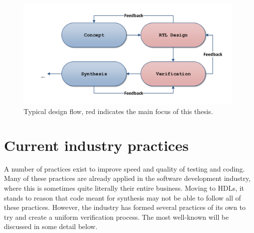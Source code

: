 \documentclass[11pt,british]{article}
\begin{document}
\begin{figure}[h]
    \centering
	\includegraphics[width=.8\textwidth]{images/designflow2.pdf}
    \caption{Typical design flow, red indicates the main focus of this thesis.}
    \label{fig:Design_Flow}
\end{figure}


\newpage

\section{Current industry practices}
\label{sec:industry}
A number of practices exist to improve speed and quality of testing and coding. Many of these practices are already applied in the software development industry, where this is sometimes quite literally their entire business. Moving to \gls{HDL}s, it stands to reason that code meant for synthesis may not be able to follow all of these practices. However, the industry has formed several practices of its own to try and create a uniform verification process. The most well-known will be discussed in some detail below.
\end{document}
